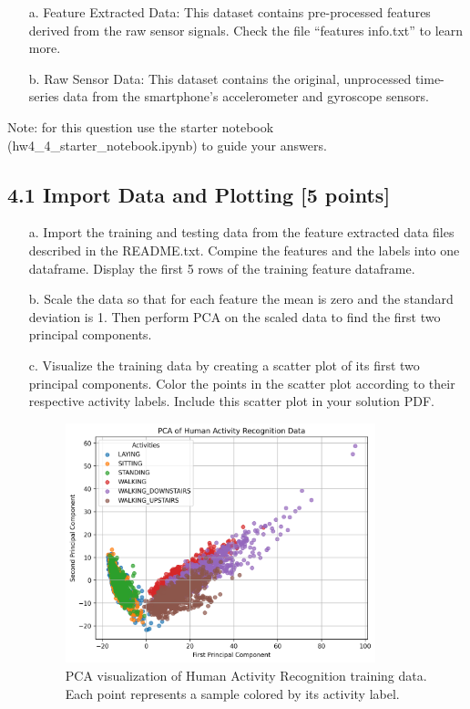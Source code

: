 \documentclass[a3paper,12pt]{extarticle} %
\begin{document}
\begin{enumerate}
\begin{itemize}
\item[a.] Feature Extracted Data: This dataset contains pre-processed features derived from the raw sensor signals. Check the file ``features info.txt'' to learn more.
\item[b.] Raw Sensor Data: This dataset contains the original, unprocessed time-series data from the smartphone's accelerometer and gyroscope sensors.
\end{itemize}

Note: for this question use the starter notebook (hw4\_4\_starter\_notebook.ipynb) to guide your answers.

\subsection*{4.1 Import Data and Plotting [5 points]}
\begin{itemize}
\item[a.] Import the training and testing data from the feature extracted data files described in the README.txt. Compine the features and the labels into one dataframe. Display the first 5 rows of the training feature dataframe.
\item[b.] Scale the data so that for each feature the mean is zero and the standard deviation is 1. Then perform PCA on the scaled data to find the first two principal components.
\item[c.] Visualize the training data by creating a scatter plot of its first two principal components. Color the points in the scatter plot according to their respective activity labels. Include this scatter plot in your solution PDF.
\begin{figure}[htbp]
    \centering
    \includegraphics[width=0.85\textwidth]{PCA_activities.png}
    \caption{PCA visualization of Human Activity Recognition training data. Each point represents a sample colored by its activity label.}
    \label{fig:pca-har}
\end{figure}


\end{itemize}
\end{enumerate}
\end{document}

